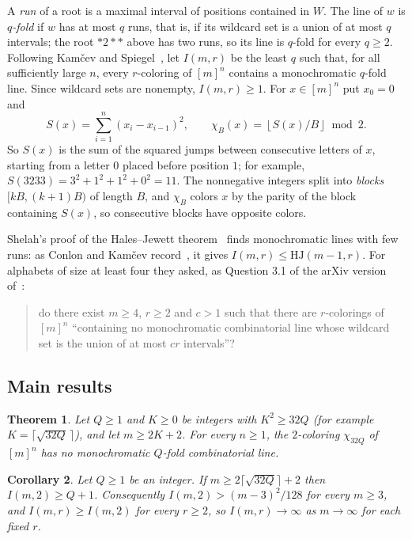 \documentclass[11pt]{article}
\newtheorem{theorem}{Theorem}
\newtheorem{corollary}[theorem]{Corollary}
\theoremstyle{remark}
\begin{document}
A \emph{run} of a root is a maximal interval of positions contained in $W$. The line of $w$ is \emph{$q$-fold} if $w$ has at most $q$ runs, that is, if its wildcard set is a union of at most $q$ intervals; the root ${*}2{*}{*}$ above has two runs, so its line is $q$-fold for every $q\ge2$. Following Kamčev and Spiegel~\cite[Section 3]{KS}, let $I(m,r)$ be the least $q$ such that, for all sufficiently large $n$, every $r$-coloring of $[m]^n$ contains a monochromatic $q$-fold line. Since wildcard sets are nonempty, $I(m,r)\ge1$. For $x\in[m]^n$ put $x_0=0$ and
\[
S(x)=\sum_{i=1}^{n}(x_i-x_{i-1})^2,\qquad \chi_B(x)=\left\lfloor S(x)/B\right\rfloor \bmod 2 .
\]
So $S(x)$ is the sum of the squared jumps between consecutive letters of $x$, starting from a letter $0$ placed before position $1$; for example, $S(3233)=3^2+1^2+1^2+0^2=11$. The nonnegative integers split into \emph{blocks} $[kB,(k+1)B)$ of length $B$, and $\chi_B$ colors $x$ by the parity of the block containing $S(x)$, so consecutive blocks have opposite colors.

Shelah's proof of the Hales--Jewett theorem~\cite{Sh} finds monochromatic lines with few runs: as Conlon and Kamčev record~\cite[Section 3]{CK}, it gives $I(m,r)\le\mathrm{HJ}(m-1,r)$. For alphabets of size at least four they asked, as Question 3.1 of the arXiv version of~\cite{CK}:
\begin{quote}
do there exist $m\ge4$, $r\ge2$ and $c>1$ such that there are $r$-colorings of $[m]^n$ ``containing no monochromatic combinatorial line whose wildcard set is the union of at most $cr$ intervals''?
\end{quote}

\subsection{Main results}

\begin{theorem}\label{thm:main}
Let $Q\ge1$ and $K\ge0$ be integers with $K^2\ge 32Q$ (for example $K=\lceil\sqrt{32Q}\,\rceil$), and let $m\ge 2K+2$. For every $n\ge1$, the $2$-coloring $\chi_{32Q}$ of $[m]^n$ has no monochromatic $Q$-fold combinatorial line.
\end{theorem}

\begin{corollary}\label{cor:growth}
Let $Q\ge1$ be an integer. If $m\ge 2\lceil\sqrt{32Q}\rceil+2$ then $I(m,2)\ge Q+1$. Consequently $I(m,2)>(m-3)^2/128$ for every $m\ge3$, and $I(m,r)\ge I(m,2)$ for every $r\ge2$, so $I(m,r)\to\infty$ as $m\to\infty$ for each fixed $r$.
\end{corollary}
\end{document}
